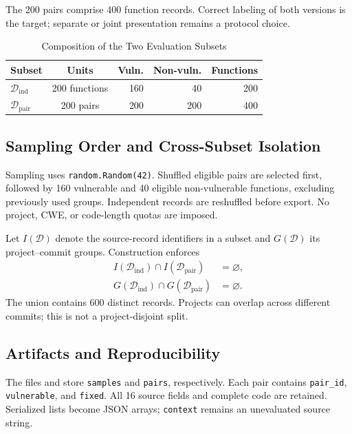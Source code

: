 \documentclass[conference]{IEEEtran}
\begin{document}
The 200 pairs comprise 400 function records. Correct labeling of both versions is the target; separate or joint presentation remains a protocol choice.

\begin{table}[t]
\caption{Composition of the Two Evaluation Subsets}
\label{tab:composition}
\centering
\begin{tabular}{@{}lcrrr@{}}
\toprule
Subset & Units & Vuln. & Non-vuln. & Functions\\
\midrule
$\mathcal{D}_{\mathrm{ind}}$ & 200 functions & 160 & 40 & 200\\
$\mathcal{D}_{\mathrm{pair}}$ & 200 pairs & 200 & 200 & 400\\
\bottomrule
\end{tabular}
\end{table}

\subsection{Sampling Order and Cross-Subset Isolation}
Sampling uses \texttt{random.Random(42)}. Shuffled eligible pairs are selected first, followed by 160 vulnerable and 40 eligible non-vulnerable functions, excluding previously used groups. Independent records are reshuffled before export. No project, CWE, or code-length quotas are imposed.

Let $I(\mathcal{D})$ denote the source-record identifiers in a subset and $G(\mathcal{D})$ its project--commit groups. Construction enforces
\begin{align}
I(\mathcal{D}_{\mathrm{ind}})\cap I(\mathcal{D}_{\mathrm{pair}})&=\varnothing,\\
G(\mathcal{D}_{\mathrm{ind}})\cap G(\mathcal{D}_{\mathrm{pair}})&=\varnothing.
\end{align}
The union contains 600 distinct records. Projects can overlap across different commits; this is not a project-disjoint split.

\subsection{Artifacts and Reproducibility}
The files  and  store \texttt{samples} and \texttt{pairs}, respectively. Each pair contains \texttt{pair\_id}, \texttt{vulnerable}, and \texttt{fixed}. All 16 source fields and complete code are retained. Serialized lists become JSON arrays; \texttt{context} remains an unevaluated source string.
\end{document}
